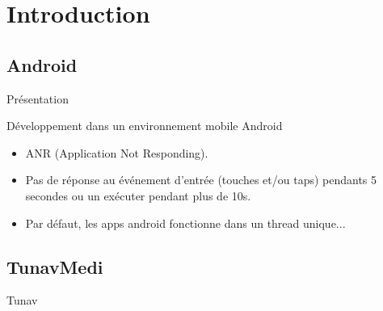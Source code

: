 \section{Introduction}
\subsection{Android}

\begin{frame}{Présentation}%
\end{frame}

\begin{frame}{Développement dans un environnement mobile Android} %
\begin{figure}[<+>]
\centering
{}
\end{figure}
    \begin{itemize}
        \item ANR (Application Not Responding).
        \item Pas de réponse au événement d'entrée (touches et/ou taps) pendants 5 secondes ou un  exécuter pendant plus de 10s.
        \pause
        \item  Par défaut, les apps android fonctionne dans un thread unique...
    \end{itemize}
\end{frame}

\subsection{TunavMedi}%

\begin{frame}{Tunav}

\end{frame}

